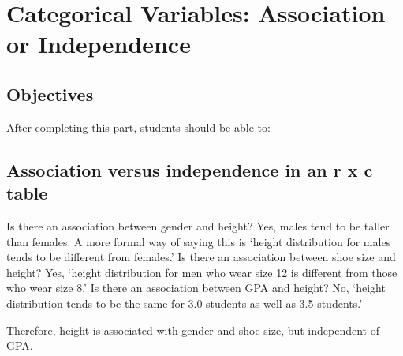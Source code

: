 \documentclass[11pt, chapterprefix=true]{scrbook}\usepackage[]{graphicx}\usepackage[]{color}
\begin{document}
\onecolumn












\chapter{Categorical Variables: Association or Independence}
\label{chap:ch14}

\section{Objectives}

After completing this part, students should be able to:


\section{Association versus independence in an r x c table}  

Is there an association between gender and height?  Yes, males tend to be taller than females.  A more formal way of saying this is `height distribution for males tends to be different from females.'   Is there an association between shoe size and height?  Yes,  `height distribution for men who wear size 12 is different from those who wear size 8.'    Is there an association between GPA and height?  No, `height distribution tends to be the same for 3.0 students as well as 3.5 students.'


Therefore, height is associated with gender and shoe size, but independent of GPA.  
\end{document}
